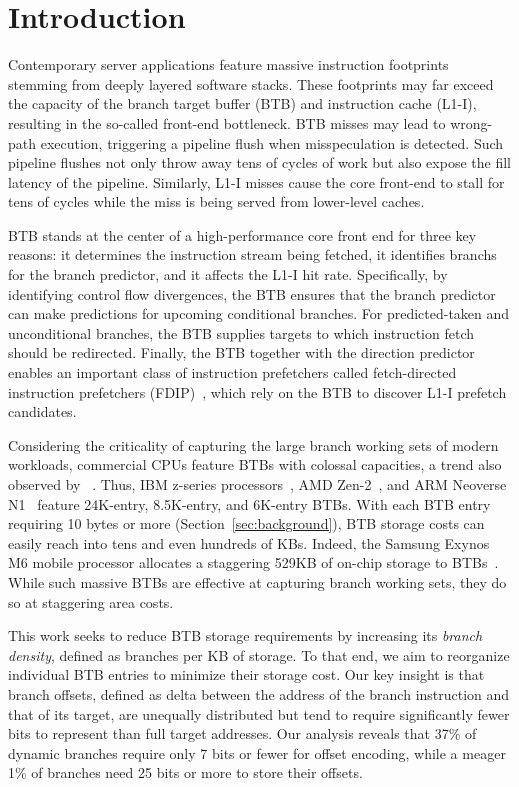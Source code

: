 \section{Introduction}
\label{sec::intro}

Contemporary server applications feature massive instruction footprints stemming from deeply layered software stacks. These footprints may far exceed the capacity of the branch target buffer (BTB) and instruction cache (L1-I), resulting in the so-called front-end bottleneck. BTB misses may lead to wrong-path execution, triggering a pipeline flush when misspeculation is detected. Such pipeline flushes not only throw away tens of cycles of work but also expose the fill latency of the pipeline. Similarly, L1-I misses cause the core front-end to stall for tens of cycles while the miss is being served from lower-level caches. 

BTB stands at the center of a high-performance core front end for three key reasons: it determines the instruction stream being fetched, it identifies branchs for the branch predictor, and it affects the L1-I hit rate. Specifically, by identifying control flow divergences, the BTB ensures that the branch predictor can make predictions for upcoming conditional branches. For predicted-taken and unconditional branches, the BTB supplies targets to which instruction fetch should be redirected. Finally, the BTB together with the direction predictor enables an important class of instruction prefetchers called fetch-directed instruction prefetchers (FDIP)~\cite{fdip, boomerang, shotgun}, which rely on the BTB to discover L1-I prefetch candidates. 

Considering the criticality of capturing the large branch working sets of modern workloads, commercial CPUs feature BTBs with colossal capacities, a trend also observed by ~\cite{rebase}. Thus, IBM z-series processors~\cite{IBMz}, AMD Zen-2~\cite{zen2}, and ARM Neoverse N1~\cite{neoverse} feature 24K-entry, 8.5K-entry, and 6K-entry BTBs. With each BTB entry requiring 10 bytes or more (Section~\ref{sec:background}), BTB storage costs can easily reach into tens and even hundreds of KBs. Indeed, the Samsung Exynos M6 mobile processor allocates a staggering 529KB of on-chip storage to BTBs~\cite{exynos}. While such massive BTBs are effective at capturing branch working sets, they do so at staggering area costs.

This work seeks to reduce BTB storage requirements by increasing its {\em branch density}, defined as branches per KB of storage. To that end, we aim to reorganize individual BTB entries to minimize their storage cost. Our key insight is that branch offsets, defined as delta between the address of the branch instruction and that of its target, are unequally distributed but tend to require significantly fewer bits to represent than full target addresses. Our analysis reveals that 37\% of dynamic branches require only 7 bits or fewer for offset encoding, while a meager 1\% of branches need 25 bits or more to store their offsets. 

